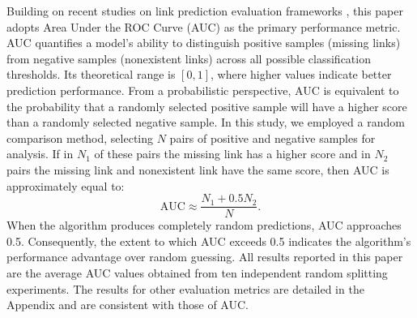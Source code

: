 \documentclass{article}
\begin{document}
Building on recent studies on link prediction evaluation frameworks \cite{zhou2023, jiao2024, bi2024, wan2025}, this paper adopts Area Under the ROC Curve (AUC) \cite{hanley1982} as the primary performance metric. AUC quantifies a model's ability to distinguish positive samples (missing links) from negative samples (nonexistent links) across all possible classification thresholds. Its theoretical range is $[0,1]$, where higher values indicate better prediction performance. From a probabilistic perspective, AUC is equivalent to the probability that a randomly selected positive sample will have a higher score than a randomly selected negative sample. In this study, we employed a random comparison method, selecting $N$ pairs of positive and negative samples for analysis. If in $N_1$ of these pairs the missing link has a higher score and in $N_2$ pairs the missing link and nonexistent link have the same score, then AUC is approximately equal to:
\begin{equation}
		 \mathrm{AUC} \approx \frac{N_1 + 0.5 N_2}{N}.
\end{equation}
When the algorithm produces completely random predictions, AUC approaches 0.5. Consequently, the extent to which AUC exceeds 0.5 indicates the algorithm's performance advantage over random guessing. All results reported in this paper are the average AUC values obtained from ten independent random splitting experiments. The results for other evaluation metrics are detailed in the Appendix and are consistent with those of AUC.

	
\end{document}
